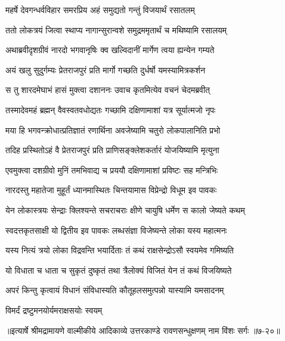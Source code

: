 \twolineshloka
{महर्षे देवगन्धर्वविहार समरप्रिय}
{अहं समुद्यतो गन्तुं विजयार्थं रसातलम्} %

\twolineshloka
{ततो लोकत्रयं जित्वा स्थाप्य नागान्सुरान्वशे}
{समुद्रममृतार्थं च मथिष्यामि रसालयम्} %

\twolineshloka
{अथाब्रवीदृशग्रीवं नारदो भगवानृषिः}
{क्व खल्विदानीं मार्गेण त्वया ह्यन्येन गम्यते} %

\twolineshloka
{अयं खलु सुदुर्गम्यः प्रेतराजपुरं प्रति}
{मार्गो गच्छति दुर्धर्षो यमस्यामित्रकर्शन} %

\twolineshloka
{स तु शारदमेघाभं हासं मुक्त्वा दशाननः}
{उवाच कृतमित्येव वचनं चेदमब्रवीत्} %

\twolineshloka
{तस्मादेवमहं ब्रह्मन् वैवस्वतवधोद्यतः}
{गच्छामि दक्षिणामाशां यत्र सूर्यात्मजो नृपः} %

\twolineshloka
{मया हि भगवन्क्रोधात्प्रतिज्ञातं रणार्थिना}
{अवजेष्यामि चतुरो लोकपालानिति प्रभो} %

\twolineshloka
{तदिह प्रस्थितोऽहं वै प्रेतराजपुरं प्रति}
{प्राणिसङ्क्लेशकर्तारं योजयिष्यामि मृत्युना} %

\twolineshloka
{एवमुक्त्वा दशग्रीवो मुनिं तमभिवाद्य च}
{प्रययौ दक्षिणामाशां प्रविष्टः सह मन्त्रिभिः} %

\twolineshloka
{नारदस्तु महातेजा मुहूर्तं ध्यानमास्थितः}
{चिन्तयामास विप्रेन्द्रो विधूम इव पावकः} %

\twolineshloka
{येन लोकास्त्रयः सेन्द्राः क्लिश्यन्ते सचराचराः}
{क्षीणे चायुषि धर्मेण स कालो जेष्यते कथम्} %

\twolineshloka
{स्वदत्तकृतसाक्षी यो द्वितीय इव पावकः}
{लब्धसंज्ञा विजेष्यन्ते लोका यस्य महात्मनः} %

\twolineshloka
{यस्य नित्यं त्रयो लोका विद्रवन्ति भयार्दिताः}
{तं कथं राक्षसेन्द्रोऽसौ स्वयमेव गमिष्यति} %

\twolineshloka
{यो विधाता च धाता च सुकृतं दुष्कृतं तथा}
{त्रैलोक्यं विजितं येन तं कथं विजयिष्यते} %

\twolineshloka
{अपरं किन्तु कृत्वायं विधानं संविधास्यति}
{कौतूहलसमुत्पन्नो यास्यामि यमसादनम्} %

\onelineshloka
{विमर्दं द्रष्टुमनयोर्यमराक्षसयोः स्वयम्} %


॥इत्यार्षे श्रीमद्रामायणे वाल्मीकीये आदिकाव्ये उत्तरकाण्डे रावणसन्धुक्षणम् नाम विंशः सर्गः ॥७-२०॥
